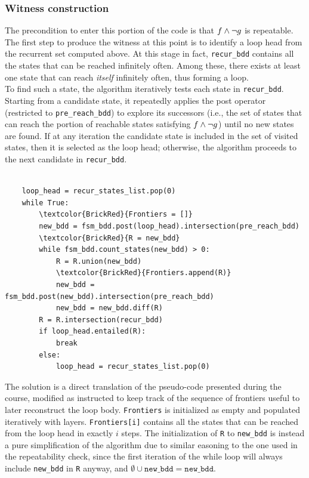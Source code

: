 \subsubsection*{Witness construction}
The precondition to enter this portion of the code is that \(f \wedge \neg g\) is repeatable. The first step to produce the witness at this point is to identify a loop head from the recurrent set computed above. At this stage in fact, \texttt{recur\_bdd} contains all the states that can be reached infinitely often. Among these, there exists at least one state that can reach \textit{itself} infinitely often, thus forming a loop.\\[2ex]
To find such a state, the algorithm iteratively tests each state in \texttt{recur\_bdd}. Starting from a candidate state, it repeatedly applies the post operator (restricted to \texttt{pre\_reach\_bdd}) to explore its successors (i.e., the set of states that can reach the portion of reachable states satisfying \(f \wedge \neg g\)) until no new states are found. If at any iteration the candidate state is included in the set of visited states, then it is selected as the loop head; otherwise, the algorithm proceeds to the next candidate in \texttt{recur\_bdd}.
\begin{scriptsize}
\begin{Verbatim}[commandchars=\\\{\}]

    loop_head = recur_states_list.pop(0)
    while True:
        \textcolor{BrickRed}{Frontiers = []}
        new_bdd = fsm_bdd.post(loop_head).intersection(pre_reach_bdd)
        \textcolor{BrickRed}{R = new_bdd}
        while fsm_bdd.count_states(new_bdd) > 0:
            R = R.union(new_bdd)
            \textcolor{BrickRed}{Frontiers.append(R)}
            new_bdd = fsm_bdd.post(new_bdd).intersection(pre_reach_bdd)
            new_bdd = new_bdd.diff(R)
        R = R.intersection(recur_bdd)
        if loop_head.entailed(R):
            break
        else:
            loop_head = recur_states_list.pop(0)

\end{Verbatim}
\end{scriptsize}
The solution is a direct translation of the pseudo-code presented during the course, modified as instructed to keep track of the sequence of frontiers useful to later reconstruct the loop body. \texttt{Frontiers} is initialized as empty and populated iteratively with layers. \texttt{Frontiers[i]} contains all the states that can be reached from the loop head in exactly \(i\) steps. The initialization of \texttt{R} to \texttt{new\_bdd} is instead a pure simplification of the algorithm due to similar easoning to the one used in the repeatability check, since the first iteration of the while loop will always include \texttt{new\_bdd} in \texttt{R} anyway, and \(\emptyset \cup \texttt{new\_bdd} = \texttt{new\_bdd}\).\\[2ex]
